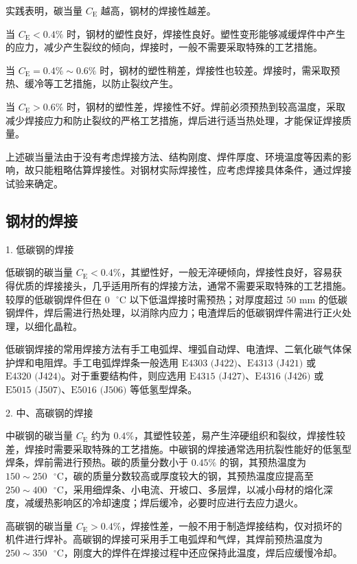 \documentclass[UTF8]{ctexbook}
\newcommand{\◎}{\ensuremath{\bigcirc}}
\begin{document}
实践表明，碳当量 $C_{\text{E}}$ 越高，钢材的焊接性越差。

当 $C_{\text{E}} < 0.4\%$ 时，钢材的塑性良好，焊接性良好。塑性变形能够减缓焊件中产生的应力，减少产生裂纹的倾向，焊接时，一般不需要采取特殊的工艺措施。

当 $C_{\text{E}} = 0.4\% \sim 0.6\%$ 时，钢材的塑性稍差，焊接性也较差。焊接时，需采取预热、缓冷等工艺措施，以防止裂纹产生。

当 $C_{\text{E}} > 0.6\%$ 时，钢材的塑性差，焊接性不好。焊前必须预热到较高温度，采取减少焊接应力和防止裂纹的严格工艺措施，焊后进行适当热处理，才能保证焊接质量。

上述碳当量法由于没有考虑焊接方法、结构刚度、焊件厚度、环境温度等因素的影响，故只能粗略估算焊接性。对钢材实际焊接性，应考虑焊接具体条件，通过焊接试验来确定。

\subsection{钢材的焊接}

1. 低碳钢的焊接

低碳钢的碳当量 $C_{\text{E}} < 0.4\%$，其塑性好，一般无淬硬倾向，焊接性良好，容易获得优质的焊接接头，几乎适用所有的焊接方法，通常不需要采取特殊的工艺措施。较厚的低碳钢焊件但在 $0\text{ }^\circ\text{C}$ 以下低温焊接时需预热；对厚度超过 $50\text{ mm}$ 的低碳钢焊件，焊后需进行热处理，以消除内应力；电渣焊后的低碳钢焊件需进行正火处理，以细化晶粒。

低碳钢焊接的常用焊接方法有手工电弧焊、埋弧自动焊、电渣焊、二氧化碳气体保护焊和电阻焊。手工电弧焊焊条一般选用 $\text{E4303 (J422)}$、$\text{E4313 (J421)}$ 或 $\text{E4320 (J424)}$。对于重要结构件，则应选用 $\text{E4315 (J427)}$、$\text{E4316 (J426)}$ 或 $\text{E5015 (J507)}$、$\text{E5016 (J506)}$ 等低氢型焊条。

2. 中、高碳钢的焊接

中碳钢的碳当量 $C_{\text{E}}$ 约为 $0.4\%$，其塑性较差，易产生淬硬组织和裂纹，焊接性较差，焊接时需要采取特殊的工艺措施。中碳钢的焊接通常选用抗裂性能好的低氢型焊条，焊前需进行预热。碳的质量分数小于 $0.45\%$ 的钢，其预热温度为 $150\sim250\text{ }^\circ\text{C}$，碳的质量分数较高或厚度较大的钢，其预热温度应提高至 $250\sim400\text{ }^\circ\text{C}$，采用细焊条、小电流、开坡口、多层焊，以减小母材的熔化深度，减缓热影响区的冷却速度；焊后缓冷，必要时应进行去应力退火。

高碳钢的碳当量 $C_{\text{E}} > 0.4\%$，焊接性差，一般不用于制造焊接结构，仅对损坏的机件进行焊补。高碳钢的焊接可采用手工电弧焊和气焊，其焊前预热温度为 $250\sim350\text{ }^\circ\text{C}$，刚度大的焊件在焊接过程中还应保持此温度，焊后应缓慢冷却。
\end{document}
